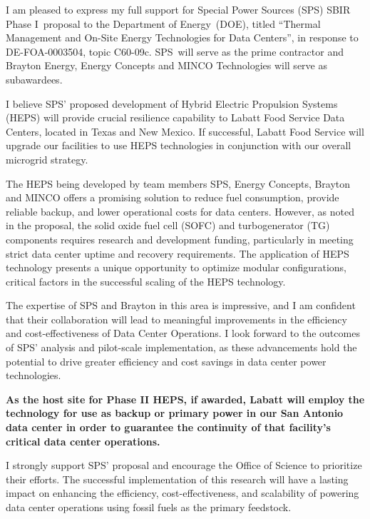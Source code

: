 \documentclass{vestaletter}
\def\BidderShort{SPS}
\def\Topic{C60-09}
\def\Subtopic{c}
\def\FunderDepartment{Department of Energy}
\def\FunderAcronym{DOE}
\def\FOAPhase{I}
\begin{document}
I am pleased to express my full support for Special Power Sources (SPS) SBIR Phase \FOAPhase\ proposal to the \FunderDepartment\ (\FunderAcronym), titled ``Thermal Management and On-Site Energy Technologies for Data Centers'', in response to DE-FOA-0003504, topic \Topic\Subtopic. \BidderShort\ will serve as the prime contractor and Brayton Energy, Energy Concepts and MINCO Technologies will serve as subawardees.

I believe \BidderShort’ proposed development of Hybrid Electric Propulsion Systems (HEPS) will provide crucial resilience capability to Labatt Food Service Data Centers, located in Texas and New Mexico.  If successful, Labatt Food Service will upgrade our facilities to use HEPS technologies in conjunction with our overall microgrid strategy.

The HEPS being developed by team members SPS, Energy Concepts, Brayton and MINCO offers a promising solution to reduce fuel consumption, provide reliable backup, and lower operational costs for data centers. However, as noted in the proposal, the solid oxide fuel cell (SOFC) and turbogenerator (TG) components requires research and development funding, particularly in meeting strict data center uptime and recovery requirements. The application of HEPS technology presents a unique opportunity to optimize modular configurations, critical factors in the successful scaling of the HEPS technology.

The expertise of SPS and Brayton in this area is impressive, and I am confident that their collaboration will lead to meaningful improvements in the efficiency and cost-effectiveness of Data Center Operations. I look forward to the outcomes of SPS' analysis and pilot-scale implementation, as these advancements hold the potential to drive greater efficiency and cost savings in data center power technologies.

\textbf{As the host site for Phase II HEPS, if awarded, Labatt will employ the technology for use as backup or primary power in our San Antonio data center in order to guarantee the continuity of that facility's critical data center operations.}

I strongly support SPS' proposal and encourage the Office of Science to prioritize their efforts. The successful implementation of this research will have a lasting impact on enhancing the efficiency, cost-effectiveness, and scalability of powering data center operations using fossil fuels as the primary feedstock.
\end{document}
